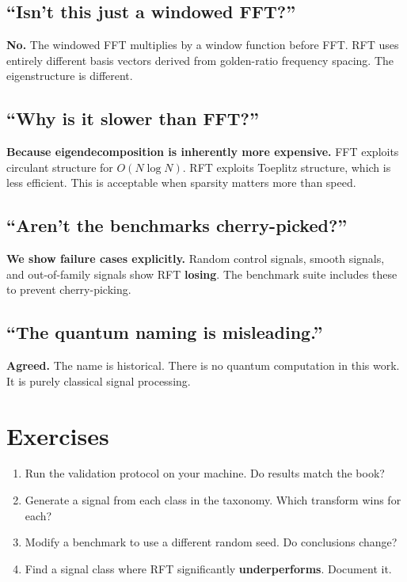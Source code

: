 \documentclass[11pt, a4paper, openany]{book}
\theoremstyle{definition}
\begin{document}
\subsection{``Isn't this just a windowed FFT?''}
\textbf{No.} The windowed FFT multiplies by a window function before FFT. RFT uses entirely different basis vectors derived from golden-ratio frequency spacing. The eigenstructure is different.

\subsection{``Why is it slower than FFT?''}
\textbf{Because eigendecomposition is inherently more expensive.} FFT exploits circulant structure for $O(N\log N)$. RFT exploits Toeplitz structure, which is less efficient. This is acceptable when sparsity matters more than speed.

\subsection{``Aren't the benchmarks cherry-picked?''}
\textbf{We show failure cases explicitly.} Random control signals, smooth signals, and out-of-family signals show RFT \textbf{losing}. The benchmark suite includes these to prevent cherry-picking.

\subsection{``The quantum naming is misleading.''}
\textbf{Agreed.} The name is historical. There is no quantum computation in this work. It is purely classical signal processing.

\section{Exercises}
\begin{enumerate}
    \item Run the validation protocol on your machine. Do results match the book?
    \item Generate a signal from each class in the taxonomy. Which transform wins for each?
    \item Modify a benchmark to use a different random seed. Do conclusions change?
    \item Find a signal class where RFT significantly \textbf{underperforms}. Document it.
\end{enumerate}

\end{document}
